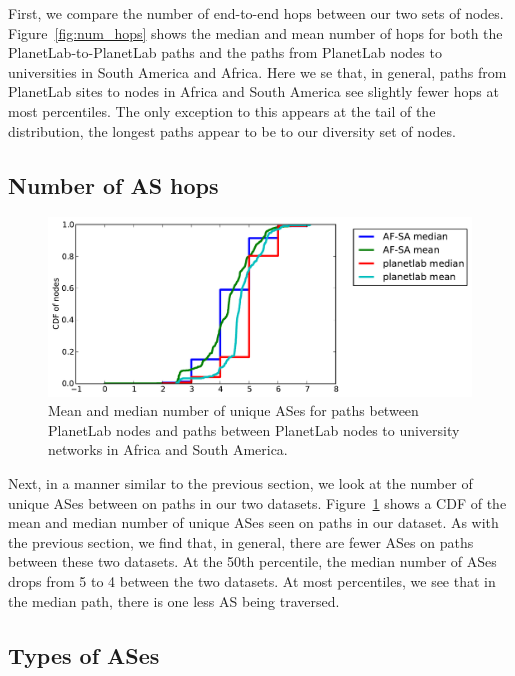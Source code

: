 \documentclass{sig-alternate-10pt}
\begin{document}
First, we compare the number of end-to-end hops between our two sets of nodes.
Figure~\ref{fig:num_hops} shows the median and mean number of hops for both the
PlanetLab-to-PlanetLab paths and the paths from PlanetLab nodes to universities
in South America and Africa. Here we se that, in general, paths from PlanetLab
sites to nodes in Africa and South America see slightly fewer hops at most
percentiles. The only exception to this appears at the tail of the
distribution, the longest paths appear to be to our diversity set of nodes.

\subsection{Number of AS hops}

\begin{figure}
\centering
    \includegraphics[width=1.0\linewidth]{figs/number_of_ases.pdf}
    \caption{Mean and median number of unique ASes for paths between PlanetLab nodes and 
paths between PlanetLab nodes to university networks in Africa and South America.}
    \label{fig:num_ases}
\end{figure}

Next, in a manner similar to the previous section, we look at the number of
unique ASes between on paths in our two datasets. Figure~\ref{fig:num_ases}
shows a CDF of the mean and median number of unique ASes seen on paths in our
dataset. As with the previous section, we find that, in general, there are
fewer ASes on paths between these two datasets. At the 50th percentile, the
median number of ASes drops from 5 to 4 between the two datasets. At most
percentiles, we see that in the median path, there is one less AS being
traversed.

\subsection{Types of ASes}
\end{document}
